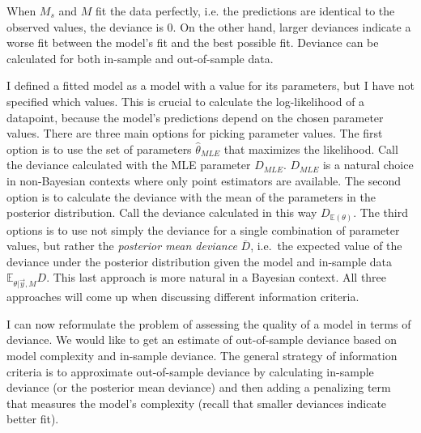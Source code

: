 \documentclass[a4paper,12pt,twoside]{article}
\begin{document}
When $M_s$ and $M$ fit the data perfectly, i.e. the predictions are identical to the observed values, the deviance is 0. On the other hand, larger deviances indicate a worse fit between the model's fit and the best possible fit. Deviance can be calculated for both in-sample and out-of-sample data. 

I defined a fitted model as a model with a value for its parameters, but I have not specified which values. This is crucial to calculate the log-likelihood of a datapoint, because the model's predictions depend on the chosen parameter values. There are three main options for picking parameter values. The first option is to use the set of parameters $\hat{\theta}_{MLE}$ that maximizes the likelihood. Call the deviance calculated with the MLE parameter $D_{MLE}$. $D_{MLE}$ is a natural choice in non-Bayesian contexts where only point estimators are available. The second option is to calculate the deviance with the mean of the parameters in the posterior distribution. Call the deviance calculated in this way $D_{\mathbb{E}(\theta)}$. The third options is to use not simply the deviance for a single combination of parameter values, but rather the \textit{posterior mean deviance} $\overline{D}$, i.e.\ the expected value of the deviance under the posterior distribution given the model and in-sample data $\mathbb{E}_{\theta | \vec{y}, M} D $. This last approach is more natural in a Bayesian context. All three approaches will come up when discussing different information criteria.

I can now reformulate the problem of assessing the quality of a model in terms of deviance. We would like to get an estimate of out-of-sample deviance based on model complexity and in-sample deviance. The general strategy of information criteria is to approximate out-of-sample deviance by calculating in-sample deviance (or the posterior mean deviance) and then adding a penalizing term that measures the model's complexity (recall that smaller deviances indicate better fit).
\end{document}
